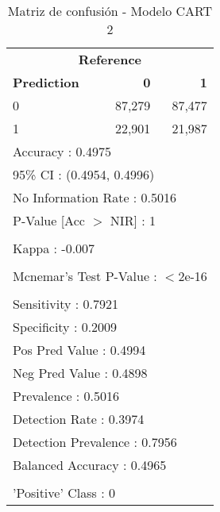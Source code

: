 \begin{table}[htbp]
\centering
\caption{Matriz de confusión - Modelo CART 2}
\label{tab:confusion-cart2}
\begin{tabular}{lrr}
\toprule
\multicolumn{3}{c}{\textbf{Reference}} \\
\textbf{Prediction} & \textbf{0} & \textbf{1} \\
\midrule
0 & 87,279 & 87,477 \\
1 & 22,901 & 21,987 \\
\midrule
\multicolumn{3}{l}{Accuracy : 0.4975} \\
\multicolumn{3}{l}{95\% CI : (0.4954, 0.4996)} \\
\multicolumn{3}{l}{No Information Rate : 0.5016} \\
\multicolumn{3}{l}{P-Value [Acc $>$ NIR] : 1} \\
\\
\multicolumn{3}{l}{Kappa : -0.007} \\
\\
\multicolumn{3}{l}{Mcnemar's Test P-Value : $<$2e-16} \\
\\
\multicolumn{3}{l}{Sensitivity : 0.7921} \\
\multicolumn{3}{l}{Specificity : 0.2009} \\
\multicolumn{3}{l}{Pos Pred Value : 0.4994} \\
\multicolumn{3}{l}{Neg Pred Value : 0.4898} \\
\multicolumn{3}{l}{Prevalence : 0.5016} \\
\multicolumn{3}{l}{Detection Rate : 0.3974} \\
\multicolumn{3}{l}{Detection Prevalence : 0.7956} \\
\multicolumn{3}{l}{Balanced Accuracy : 0.4965} \\
\\
\multicolumn{3}{l}{'Positive' Class : 0} \\
\bottomrule
\end{tabular}
\end{table}